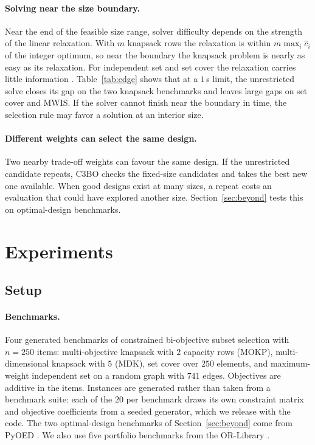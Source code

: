 \documentclass{article}
\newcommand{\revtext}[1]{{\color{blue}#1}}
\theoremstyle{remark}\newtheorem{remark}[proposition]{Remark}
\begin{document}
\paragraph{\revtext{Solving near the size boundary.}}
\revtext{Near the end of the feasible size range, solver difficulty depends on the strength of the linear relaxation.} With $m$ knapsack rows the relaxation is within
$m\max_i\hat c_i$ of the integer optimum, so near the boundary the knapsack problem is nearly as easy
as its relaxation. For independent set and set cover the relaxation carries
little information \citep{lovasz1975ratio,chvatal1979greedy}. \revtext{Table~\ref{tab:edge} shows that at a $1$\,s limit, the unrestricted solve closes its gap on the two knapsack benchmarks and leaves large gaps on set cover and MWIS.} \revtext{If the solver cannot finish near the boundary in time, the selection rule may favor a solution at an interior size.}

\paragraph{\revtext{Different weights can select the same design.}}
\revtext{Two nearby trade-off weights can favour the same design. If the unrestricted candidate repeats, C3BO checks the fixed-size candidates and takes the best new one available. When good designs exist at many sizes, a repeat costs an evaluation that could have explored another size. Section~\ref{sec:beyond} tests this on optimal-design benchmarks.}

\section{Experiments}\label{sec:exp}

\subsection{Setup}\label{sec:protocol}

\paragraph{Benchmarks.}
Four generated benchmarks of constrained bi-objective subset selection with $n=250$ items:
multi-objective knapsack with $2$ capacity rows (MOKP), multi-dimensional knapsack with
$5$ (MDK), set cover over $250$ elements, and maximum-weight independent set on a
random graph with $741$ edges. Objectives are additive in the items. Instances
are generated rather than taken from a benchmark suite: each of the $20$ per
benchmark draws its own constraint matrix and objective coefficients from a seeded
generator, which we release with the code. The two optimal-design benchmarks of
Section~\ref{sec:beyond} come from PyOED \citep{chowdhary2025pyoed}\revtext{. We also use five portfolio benchmarks from the OR-Library \citep{beasley1990or}}.
\end{document}

